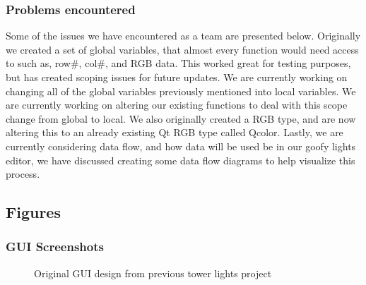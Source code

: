 \documentclass[11pt]{article} %
\begin{document}
\subsubsection{Problems encountered}
Some of the issues we have encountered as a team are presented below. Originally we created a set of global variables, that almost every function would need access to such as, row\#, col\#, and RGB data. This worked great for testing purposes, but has created scoping issues for future updates. We are currently working on changing all of the global variables previously mentioned into local variables. We are currently working on altering our existing functions to deal with this scope change from global to local. We also originally created a RGB type, and are now altering this to an already existing Qt RGB type called Qcolor. Lastly, we are currently considering data flow, and how data will be used be in our goofy lights editor, we have discussed creating some data flow diagrams to help visualize this process.




\subsection{Figures}
\subsubsection{GUI Screenshots}
  
  \begin{figure}[H]
  	\centering
  	\caption{Original GUI design from previous tower lights project}
  	\label{fig:GUI Base Design Reference}
  \end{figure}
  
\end{document}
